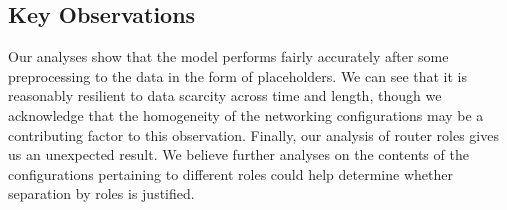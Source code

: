\subsection{Key Observations}
Our analyses show that the model performs fairly accurately after some preprocessing to the data in the form of placeholders. We can see that it is reasonably resilient to data scarcity across time and length, though we acknowledge that the homogeneity of the networking configurations may be a contributing factor to this observation. Finally, our analysis of router roles gives us an unexpected result. We believe further analyses on the contents of the configurations pertaining to different roles could help determine whether separation by roles is justified.
